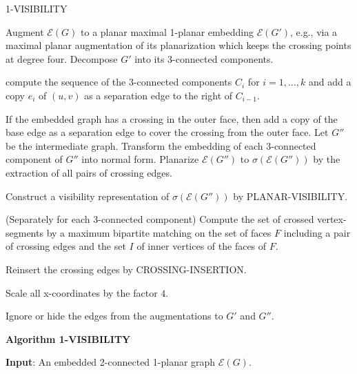 \documentclass[runningheads]{llncs}
\begin{document}
\begin{algorithm}

  \caption{1-VISIBILITY}\label{alg:1-visibility}


  Augment $\mathcal{E}(G)$ to a planar maximal 1-planar embedding $\mathcal{E}(G')$,
  e.g., via a maximal planar augmentation of its planarization which keeps the crossing
  points at degree four.\;
  Decompose $G'$ into its 3-connected components.\;

    {compute the sequence of the 3-connected components
  $C_i$ for $i= 1, \ldots, k$ and add a copy $e_i$ of $(u,v)$
  as a separation edge to the right of $C_{i-1}$.
  }

  If the embedded graph has a crossing in the outer face, then
  add a copy of the base edge as a separation edge to cover the crossing from the outer face.
  Let $G''$ be the intermediate graph. \;
  Transform the embedding of each 3-connected component of $G''$ into normal
  form.\;
  Planarize $\mathcal{E}(G'')$ to $\sigma (\mathcal{E}(G''))$
     by the extraction of  all pairs of crossing  edges.\;

     Construct a visibility representation of $\sigma (\mathcal{E}(G''))$
     by PLANAR-VISIBILITY.\;

     (Separately for each 3-connected component) Compute the set of crossed vertex-segments by a
     maximum bipartite matching on the set of faces $F$ including a pair of crossing
     edges and the set   $I$ of inner vertices of the faces of $F$.\;

     Reinsert the crossing edges by CROSSING-INSERTION.\;

    Scale all x-coordinates by the factor $4$. \;

    Ignore or hide the edges from the augmentations to $G'$ and $G''$.

\end{algorithm}








\iffalse



\textbf{Algorithm  1-VISIBILITY}

\textbf{Input}: An embedded 2-connected 1-planar graph
$\mathcal{E}(G)$.
\end{document}
